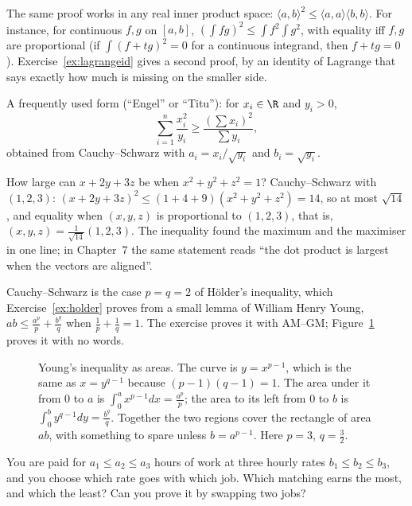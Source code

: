 The same proof works in any real inner product space: $\langle a,b\rangle^2\le\langle a,a\rangle\langle b,b\rangle$. For instance, for continuous $f,g$ on $[a,b]$,
$\left(\int fg\right)^2\le\int f^2\int g^2$, with equality iff $f,g$ are proportional (if $\int(f+tg)^2=0$ for a continuous integrand, then $f+tg=0$).
Exercise~\ref{ex:lagrangeid} gives a second proof, by an identity of Lagrange that says exactly how much is missing on the smaller side.

A frequently used form (``Engel'' or ``Titu''): for $x_i\in\R$ and $y_i>0$,
\[
\sum_{i=1}^n\frac{x_i^2}{y_i}\ge\frac{\left(\sum x_i\right)^2}{\sum y_i},
\]
obtained from Cauchy--Schwarz with $a_i=x_i/\sqrt{y_i}$ and $b_i=\sqrt{y_i}$.

\begin{examplex}
How large can $x+2y+3z$ be when $x^2+y^2+z^2=1$? Cauchy--Schwarz with $(1,2,3)$: $(x+2y+3z)^2\le(1+4+9)(x^2+y^2+z^2)=14$, so at most $\sqrt{14}$,
and equality when $(x,y,z)$ is proportional to $(1,2,3)$, that is, $(x,y,z)=\frac1{\sqrt{14}}(1,2,3)$. The inequality found the maximum and the
maximiser in one line; in Chapter~7 the same statement reads ``the dot product is largest when the vectors are aligned''.
\end{examplex}

Cauchy--Schwarz is the case $p=q=2$ of H\"older's inequality, which Exercise~\ref{ex:holder} proves from a small lemma of William Henry Young,
$ab\le\frac{a^p}p+\frac{b^q}q$ when $\frac1p+\frac1q=1$. The exercise proves it with AM--GM; Figure~\ref{fig:young} proves it with no words.

\begin{figure}[ht]
\centering
{}
\caption{Young's inequality as areas. The curve is $y=x^{p-1}$, which is the same as $x=y^{q-1}$ because $(p-1)(q-1)=1$. The area under it from $0$ to $a$ is $\int_0^ax^{p-1}dx=\frac{a^p}p$; the area to its left from $0$ to $b$ is $\int_0^by^{q-1}dy=\frac{b^q}q$. Together the two regions cover the rectangle of area $ab$, with something to spare unless $b=a^{p-1}$. Here $p=3$, $q=\frac32$.}
\label{fig:young}
\end{figure}

\begin{think}
You are paid for $a_1\le a_2\le a_3$ hours of work at three hourly rates $b_1\le b_2\le b_3$, and you choose which rate goes with which job. Which matching earns the most, and which the least? Can you prove it by swapping two jobs?
\end{think}

